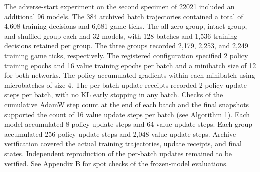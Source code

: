 \documentclass{article}
\begin{document}
The adverse-start experiment on the second specimen of 22021 included an additional 96 models. The 384 archived batch trajectories contained a total of 4,608 training decisions and 6,681 game ticks. The all-zero group, intact group, and shuffled group each had 32 models, with 128 batches and 1,536 training decisions retained per group. The three groups recorded 2,179, 2,253, and 2,249 training game ticks, respectively. The registered configuration specified 2 policy training epochs and 16 value training epochs per batch and a minibatch size of 12 for both networks. The policy accumulated gradients within each minibatch using microbatches of size 4. The per-batch update receipts recorded 2 policy update steps per batch, with no KL early stopping in any batch. Checks of the cumulative AdamW step count at the end of each batch and the final snapshots supported the count of 16 value update steps per batch (see Algorithm 1). Each model accumulated 8 policy update steps and 64 value update steps. Each group accumulated 256 policy update steps and 2,048 value update steps. Archive verification covered the actual training trajectories, update receipts, and final states. Independent reproduction of the per-batch updates remained to be verified. See Appendix B for spot checks of the frozen-model evaluations.
\end{document}
